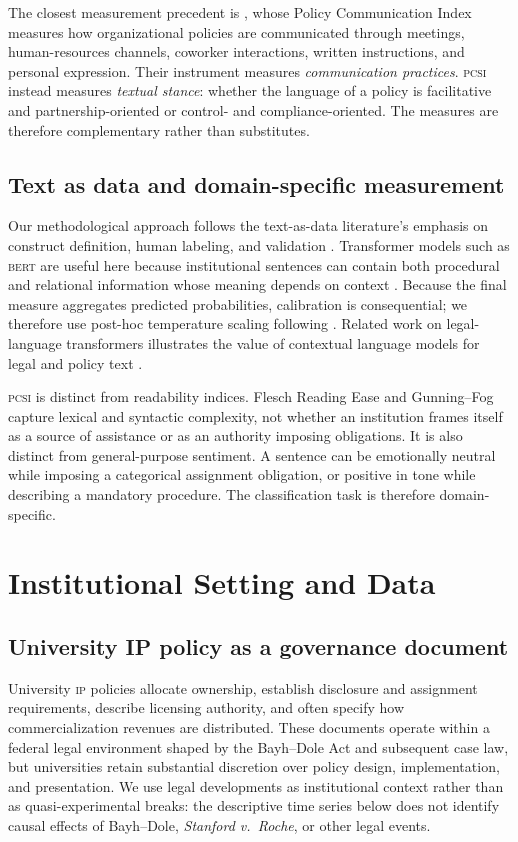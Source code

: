 \documentclass[12pt]{article}
\newcommand{\PCSI}{\textsc{pcsi}}
\newcommand{\IP}{\textsc{ip}}
\newcommand{\BERT}{\textsc{bert}}
\begin{document}
The closest measurement precedent is \citet{Canary2013}, whose Policy Communication Index measures how organizational policies are communicated through meetings, human-resources channels, coworker interactions, written instructions, and personal expression. Their instrument measures \emph{communication practices}. \PCSI{} instead measures \emph{textual stance}: whether the language of a policy is facilitative and partnership-oriented or control- and compliance-oriented. The measures are therefore complementary rather than substitutes.

\subsection{Text as data and domain-specific measurement}

Our methodological approach follows the text-as-data literature's emphasis on construct definition, human labeling, and validation \citep{GrimmerStewart2013,Gentzkow2019}. Transformer models such as \BERT{} are useful here because institutional sentences can contain both procedural and relational information whose meaning depends on context \citep{Devlin2019}. Because the final measure aggregates predicted probabilities, calibration is consequential; we therefore use post-hoc temperature scaling following \citet{Guo2017}. Related work on legal-language transformers illustrates the value of contextual language models for legal and policy text \citep{Chalkidis2020}.

\PCSI{} is distinct from readability indices. Flesch Reading Ease and Gunning--Fog capture lexical and syntactic complexity, not whether an institution frames itself as a source of assistance or as an authority imposing obligations. It is also distinct from general-purpose sentiment. A sentence can be emotionally neutral while imposing a categorical assignment obligation, or positive in tone while describing a mandatory procedure. The classification task is therefore domain-specific.

\section{Institutional Setting and Data}

\subsection{University IP policy as a governance document}

University \IP{} policies allocate ownership, establish disclosure and assignment requirements, describe licensing authority, and often specify how commercialization revenues are distributed. These documents operate within a federal legal environment shaped by the Bayh--Dole Act and subsequent case law, but universities retain substantial discretion over policy design, implementation, and presentation. We use legal developments as institutional context rather than as quasi-experimental breaks: the descriptive time series below does not identify causal effects of Bayh--Dole, \emph{Stanford v.\ Roche}, or other legal events.
\end{document}
